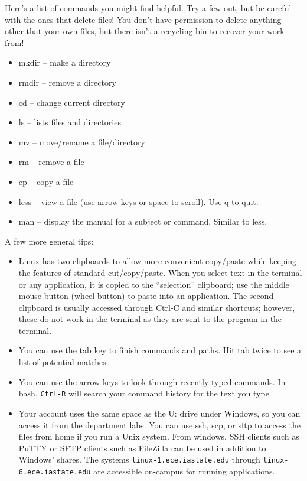 \documentclass[letterpaper,10pt]{article}
\newcommand{\cmd}[1]{\texttt{#1}}
\begin{document}
Here's a list of commands you might find helpful. Try a few out, but be careful with the ones that delete files! You don't have permission to delete anything other that your own files, but there isn't a recycling bin to recover your work from!

\begin{itemize}
\item mkdir -- make a directory
\item rmdir -- remove a directory
\item cd -- change current directory
\item ls -- lists files and directories
\item mv -- move/rename a file/directory
\item rm -- remove a file
\item cp -- copy a file
\item less -- view a file (use arrow keys or space to scroll). Use q to quit.
\item man -- display the manual for a subject or command. Similar to less.
\end{itemize}

A few more general tips:

\begin{itemize}
 \item Linux has two clipboards to allow more convenient copy/paste while keeping the features of standard cut/copy/paste. When you select text in the terminal or any application, it is copied to the ``selection'' clipboard; use the middle mouse button (wheel button) to paste into an application. The second clipboard is usually accessed through Ctrl-C and similar shortcuts; however, these do not work in the terminal as they are sent to the program in the terminal.
 \item You can use the tab key to finish commands and paths. Hit tab twice to see a list of potential matches.
 \item You can use the arrow keys to look through recently typed commands. In bash, \cmd{Ctrl-R} will search your command history for the text you type.
 \item Your account uses the same space as the U: drive under Windows, so you can access it from the department labs. You can use ssh, scp, or sftp to access the files from home if you run a Unix system. From windows, SSH clients such as PuTTY or SFTP clients such as FileZilla can be used in addition to Windows' shares. The systems \texttt{linux-1.ece.iastate.edu} through \texttt{linux-6.ece.iastate.edu} are accessible on-campus for running applications.
\end{itemize}
\end{document}

